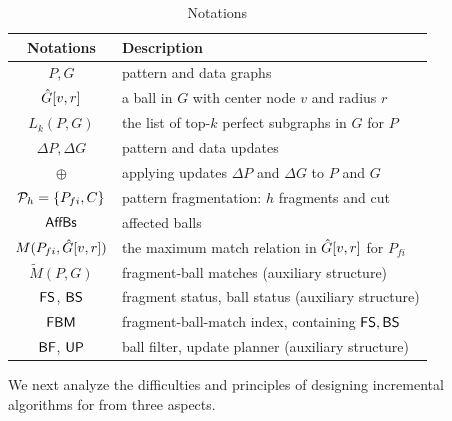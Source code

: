 \begin{table}[tb!]
	\begin{center}
		\begin{small}
			\scriptsize
			\begin{tabular}{|c|l|}
				\hline
				{\bf Notations}             &  {\bf Description}     \\
				\hline\hline
				$P,G$                     &  pattern and data graphs       \\ \hline
				$\hat{G}{[v, r]}$              &  a ball in $G$ with center node $v$ and radius $r$  \\ \hline
				$L_k(P, G)$                  &  the list of top-$k$ perfect subgraphs in $G$ for $P$  \\ \hline
				$\Delta P, \Delta G$       &  pattern and data updates       \\ \hline
				$\oplus$                    &  applying updates $\Delta P$ and $\Delta G$ to $P$ and $G$       \\ \hline
				${\cal P}_{h}=\{P_{fi}, C\}$     &  pattern fragmentation: $h$ fragments and cut    \\ \hline
				${\mathsf{AffBs}}$                &  affected balls       \\ \hline
				$M(P_{fi}, \hat{G}{[v,r]})$    &  the maximum match relation in $\hat{G}{[v,r]}$ for $P_{fi}$   \\ \hline
				$\tilde{M}(P,G)$            &  fragment-ball matches (auxiliary structure)     \\ \hline
				${\mathsf{FS}}$, ${\mathsf{BS}}$              &  fragment status, ball status (auxiliary structure) \\    \hline
				${\mathsf{FBM}}$                       &  fragment-ball-match index, containing ${\mathsf{FS}}, {\mathsf{BS}}$ \\    \hline
				${\mathsf{BF}}$, ${\mathsf{UP}}$              &  ball filter, update planner (auxiliary structure) \\    \hline
			\end{tabular}
			\vspace{-1ex}
		\end{small}
		\caption{Notations}
		\label{tab-notation}
		\vspace{-6ex}
	\end{center}
\end{table}


We next analyze the difficulties and principles of designing incremental algorithms for \dynteamF{} from three aspects.

